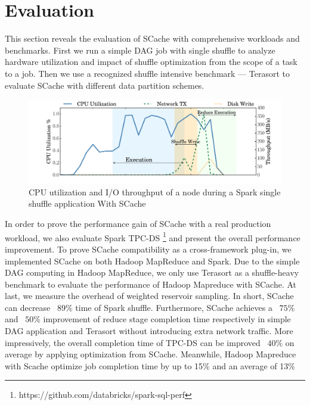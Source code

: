 \section{Evaluation}\label{evaluation}
This section reveals the evaluation of SCache with comprehensive workloads and benchmarks. 
First we run a simple DAG job with single shuffle to analyze hardware utilization and impact of shuffle optimization from the scope of a task to a job. 
Then we use a recognized shuffle intensive benchmark --- Terasort \cite{spark-tera} to evaluate SCache with different data partition schemes.

\begin{figure}
	\includegraphics[width=\linewidth]{fig/scache_util}
	\caption{CPU utilization and I/O throughput of a node during a Spark single shuffle application With SCache}
	\label{fig:scache_util}
\end{figure}

In order to prove the performance gain of SCache with a real production workload, we also evaluate Spark TPC-DS \footnote{https://github.com/databricks/spark-sql-perf} and present the overall performance improvement.
{\color{blue}
To prove SCache compatibility as a cross-framework plug-in, we implemented SCache on both Hadoop MapReduce and Spark. 
Due to the simple DAG computing in Hadoop MapReduce, we only use Terasort as a shuffle-heavy benchmark to evaluate the performance of Hadoop Mapreduce with SCache.
}
At last, we measure the overhead of weighted reservoir sampling. 
In short, SCache can decrease ~$89\%$ time of Spark shuffle. Furthermore, SCache achieves a ~$75\%$ and ~$50\%$ improvement of reduce stage completion time respectively in simple DAG application and Terasort without introducing extra network traffic. More impressively, the overall completion time of TPC-DS can be improved ~$40\%$ on average by applying optimization from SCache.
{\color{blue}Meanwhile, Hadoop Mapreduce with Scache optimize job completion time by up to 15\% and an average of 13\%}

